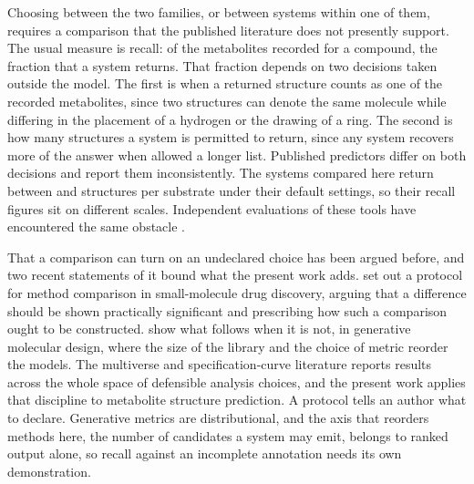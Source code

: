 Choosing between the two families, or between systems within one of them, requires a comparison
that the published literature does not presently support. The usual measure is recall: of the
metabolites recorded for a compound, the fraction that a system returns. That fraction depends on
two decisions taken outside the model. The first is when a returned structure counts as one of the
recorded metabolites, since two structures can denote the same molecule while differing in the
placement of a hydrogen or the drawing of a ring. The second is how many structures a system is
permitted to return, since any system recovers more of the answer when allowed a longer list.
Published predictors differ on both decisions and report them inconsistently. The systems compared
here return between \numWholeemitMin{} and \numWholeemitMax{} structures per substrate under their
default settings, so their recall figures sit on different scales. Independent
evaluations of these tools have encountered the same obstacle
\citep{Boyce_2022, Scholz_2023, Gao_2026}.

That a comparison can turn on an undeclared choice has been argued before, and two recent
statements of it bound what the present work adds. \citet{Ash_2025} set out a protocol for method
comparison in small-molecule drug discovery, arguing that a difference should be shown practically
significant and prescribing how such a comparison ought to be constructed. \citet{Ozcelik_2025}
show what follows when it is not, in generative molecular design, where the size of the library
and the choice of metric reorder the models. The multiverse and specification-curve literature
\citep{Steegen_2016, Simonsohn_2020} reports results across the whole space of defensible analysis
choices, and the present work applies that discipline to metabolite structure prediction. A protocol tells an
author what to declare. Generative metrics are distributional, and the axis that reorders methods
here, the number of candidates a system may emit, belongs to ranked output alone, so recall
against an incomplete annotation needs its own demonstration.

